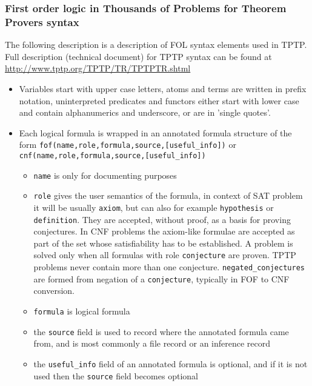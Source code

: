 \subsubsection{First order logic in Thousands of Problems for Theorem Provers syntax}

The following description is a description of \gls{FOL} syntax elements used in \gls{TPTP}. Full description (technical document) for TPTP syntax can be found at \url{http://www.tptp.org/TPTP/TR/TPTPTR.shtml}

\begin{itemize}
  \item Variables start with upper case letters, atoms and terms are written in prefix notation, uninterpreted predicates and functors either start with lower case and contain alphanumerics and underscore, or are in 'single quotes'.

  \item Each logical formula is wrapped in an annotated formula structure of the form \texttt{fof(name,role,formula,source,[useful_info])} or \texttt{cnf(name,role,formula,source,[useful_info])}

    \begin{itemize}
      \item \texttt{name} is only for documenting purposes
      \item \texttt{role} gives the user semantics of the formula, in context of SAT problem it will be usually \texttt{axiom}, but can also for example \texttt{hypothesis} or \texttt{definition}. They are accepted, without proof, as a basis for proving conjectures. In CNF problems the axiom-like formulae are accepted as part of the set whose satisfiability has to be established. A problem is solved only when all formulas with role \texttt{conjecture} are proven. TPTP problems never contain more than one conjecture. \texttt{negated_conjectures} are formed from negation of a \texttt{conjecture}, typically in FOF to CNF conversion.
      \item \texttt{formula} is logical formula
      \item the \texttt{source} field is used to record where the annotated formula came from, and is most commonly a file record or an inference record
      \item the \texttt{useful_info} field of an annotated formula is optional, and if it is not used then the \texttt{source} field becomes optional
    \end{itemize}


\end{itemize}
